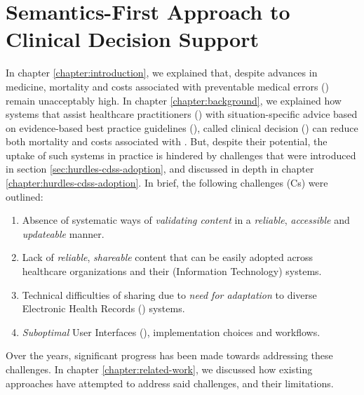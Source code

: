 \chapter{Semantics-First Approach to Clinical Decision Support}

In chapter \ref{chapter:introduction}, we explained that, despite
advances in medicine, mortality and costs associated with preventable
medical errors (\PMEs{}) remain unacceptably high. In chapter
\ref{chapter:background}, we explained how systems that
assist healthcare practitioners (\HCPs{}) with situation-specific
advice based on evidence-based best practice guidelines (\BPGs{}),
called clinical decision (\CDSSs{}) can reduce both mortality
and costs associated with \PMEs{}. But, despite their potential,
the uptake of such systems in practice is hindered by challenges
that were introduced in section \ref{sec:hurdles-cdss-adoption}, and
discussed in depth in chapter \ref{chapter:hurdles-cdss-adoption}.
In brief, the following challenges (Cs) were outlined:
\begin{enumerate}[label=C\arabic*.]
\itemsep0.0em
\item Absence of systematic ways of \emph{validating content}
in a \emph{reliable}, \emph{accessible} and \emph{updateable} manner.
\item Lack of \emph{reliable}, \emph{shareable} \CDSS{} content
that can be easily adopted across healthcare organizations and their (Information
Technology) \IT{} systems.
\item Technical difficulties of sharing due to \emph{need for
  adaptation} to diverse Electronic Health Records (\EHR) systems.
\item \emph{Suboptimal} User Interfaces (\UIs), implementation choices and
workflows.
\end{enumerate}

Over the years, significant progress has been made towards
addressing these challenges. In chapter \ref{chapter:related-work},
we discussed how existing approaches have attempted to
address said challenges, and their limitations.
